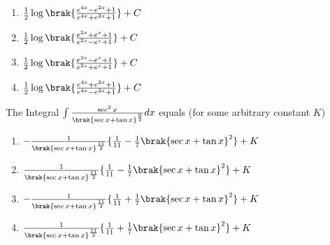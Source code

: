 \hfill{}
\begin{multicols}{2}
\begin{enumerate}
    \item $\frac{1}{2}\log\brak{\frac{e^{4x}-e^{2x}+1}{e^{4x}+e^{2x}+1}} + C$
    \item $\frac{1}{2}\log\brak{\frac{e^{2x}+e^{x}+1}{e^{2x}-e^{x}+1}} + C$
    \item $\frac{1}{2}\log\brak{\frac{e^{2x}-e^{x}+1}{e^{2x}+e^{x}+1}} + C$ 
    \item $\frac{1}{2}\log\brak{\frac{e^{4x}+e^{2x}+1}{e^{4x}-e^{2x}+1}} + C$
\end{enumerate}
\end{multicols}
\item The Integral $\int\frac{\sec^{2}x}{\brak{\sec x +\tan x}^\frac{9}{2}}dx $  equals (for some arbitrary constant $K$)
\hfill {}
\begin{enumerate}
    \item $-\frac{1}{\brak{\sec x + \tan x}^{\frac{11}{2}}} \{ \frac{1}{11} - \frac{1}{7}\brak{\sec x +\tan x}^{2}\} + K$
    \item $\frac{1}{\brak{\sec x + \tan x}^{\frac{11}{2}}} \{ \frac{1}{11} - \frac{1}{7}\brak{\sec x +\tan x}^{2}\} + K$
    \item $-\frac{1}{\brak{\sec x + \tan x}^{\frac{11}{2}}} \{ \frac{1}{11} + \frac{1}{7}\brak{\sec x +\tan x}^{2}\} + K$
    \item  $\frac{1}{\brak{\sec x + \tan x}^{\frac{11}{2}}} \{ \frac{1}{11} + \frac{1}{7}\brak{\sec x +\tan x}^{2}\} + K$
\end{enumerate}

